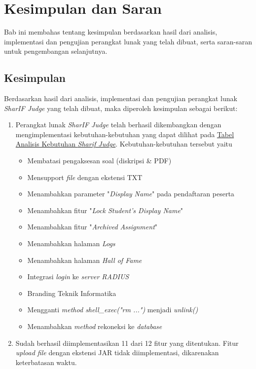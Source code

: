 \chapter{Kesimpulan dan Saran}
\label{chap:kesimpulan dan saran}

Bab ini membahas tentang kesimpulan berdasarkan hasil dari analisis, implementasi dan pengujian perangkat lunak yang telah dibuat, serta saran-saran untuk pengembangan selanjutnya.

\section{Kesimpulan}
Berdasarkan hasil dari analisis, implementasi dan pengujian perangkat lunak \textit{SharIF Judge} yang telah dibuat, maka diperoleh kesimpulan sebagai berikut:
\begin{enumerate}
	\item Perangkat lunak \textit{SharIF Judge} telah berhasil dikembangkan dengan mengimplementasi kebutuhan-kebutuhan yang dapat dilihat pada \hyperref[tab:kebutuhan]{Tabel Analisis Kebutuhan \textit{Sharif Judge}}. Kebutuhan-kebutuhan tersebut yaitu
	\begin{itemize}
		\item Membatasi pengaksesan soal (diskripsi \& PDF)
		\item Mensupport \textit{file} dengan ekstensi TXT
		\item Menambahkan parameter "\textit{Display Name}" pada pendaftaran peserta
		\item Menambahkan fitur "\textit{Lock Student's Display Name}"
		\item Menambahkan fitur "\textit{Archived Assignment}"
		\item Menambahkan halaman \textit{Logs}
		\item Menambahkan halaman \textit{Hall of Fame}
		\item Integrasi \textit{login} ke \textit{server RADIUS}
		\item Branding Teknik Informatika
		\item Mengganti \textit{method shell\_exec("rm ...")} menjadi\textit{ unlink()}
		\item Menambahkan \textit{method} rekoneksi ke \textit{database}
	\end{itemize}

	\item Sudah berhasil diimplementasikan 11 dari 12 fitur yang ditentukan. Fitur \textit{upload file} dengan ekstensi JAR tidak diimplementasi, dikarenakan keterbatasan waktu.
\end{enumerate}

